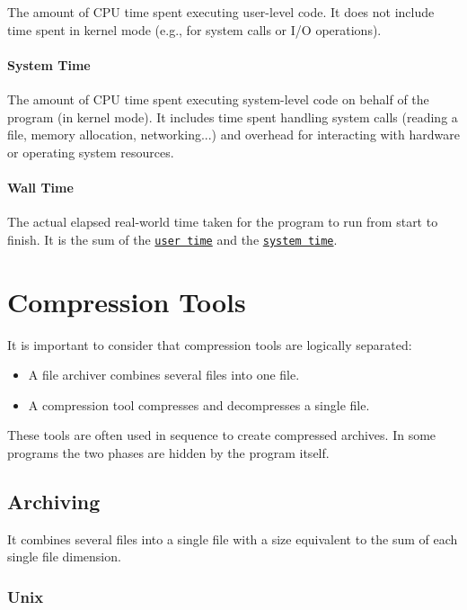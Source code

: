\documentclass[12pt, a4paper]{report}
\begin{document}
The amount of CPU time spent executing user-level code.
It does not include time spent in kernel mode (e.g., for system calls or I/O operations).

\subsubsection{System Time}
\label{subsubsec:system_time}

The amount of CPU time spent executing system-level code on behalf of the program (in kernel mode).
It includes time spent handling system calls (reading a file, memory allocation, networking...) and overhead for interacting with
hardware or operating system resources.

\subsubsection{Wall Time}
\label{subsubsec:wall_time}

The actual elapsed real-world time taken for the program to run from start to finish.
It is the sum of the \hyperref[subsubsec:user_time]{\texttt{user time}} and the
\hyperref[subsubsec:system_time]{\texttt{system time}}.

\chapter{Compression Tools}

It is important to consider that compression tools are logically separated:

\begin{itemize}
  \item A file archiver combines several files into one file.
  \item A compression tool compresses and decompresses a single file.
\end{itemize}

These tools are often used in sequence to create compressed archives.
In some programs the two phases are hidden by the program itself.

\section{Archiving}

It combines several files into a single file with a size equivalent to the sum of each single file dimension.

\subsection{Unix}
\end{document}
